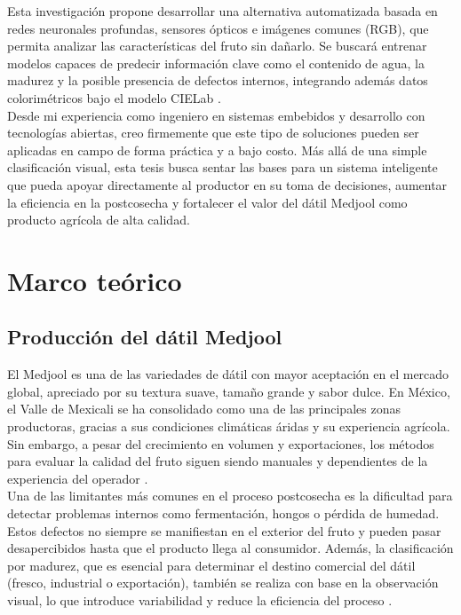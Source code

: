 Esta investigación propone desarrollar una alternativa automatizada basada en redes neuronales profundas, sensores ópticos e imágenes comunes (RGB), que permita analizar las características del fruto sin dañarlo. Se buscará entrenar modelos capaces de predecir información clave como el contenido de agua, la madurez y la posible presencia de defectos internos, integrando además datos colorimétricos bajo el modelo CIELab \parencite{habib_external_2022}.\\

Desde mi experiencia como ingeniero en sistemas embebidos y desarrollo con tecnologías abiertas, creo firmemente que este tipo de soluciones pueden ser aplicadas en campo de forma práctica y a bajo costo. Más allá de una simple clasificación visual, esta tesis busca sentar las bases para un sistema inteligente que pueda apoyar directamente al productor en su toma de decisiones, aumentar la eficiencia en la postcosecha y fortalecer el valor del dátil Medjool como producto agrícola de alta calidad.\\


\section{Marco teórico}

\subsection{Producción del dátil Medjool}

El Medjool es una de las variedades de dátil con mayor aceptación en el mercado global, apreciado por su textura suave, tamaño grande y sabor dulce. En México, el Valle de Mexicali se ha consolidado como una de las principales zonas productoras, gracias a sus condiciones climáticas áridas y su experiencia agrícola. Sin embargo, a pesar del crecimiento en volumen y exportaciones, los métodos para evaluar la calidad del fruto siguen siendo manuales y dependientes de la experiencia del operador \parencite{salomon-torres_produccion_2017}.\\

Una de las limitantes más comunes en el proceso postcosecha es la dificultad para detectar problemas internos como fermentación, hongos o pérdida de humedad. Estos defectos no siempre se manifiestan en el exterior del fruto y pueden pasar desapercibidos hasta que el producto llega al consumidor. Además, la clasificación por madurez, que es esencial para determinar el destino comercial del dátil (fresco, industrial o exportación), también se realiza con base en la observación visual, lo que introduce variabilidad y reduce la eficiencia del proceso \parencite{perez-perez_evaluation_2021}.\\

